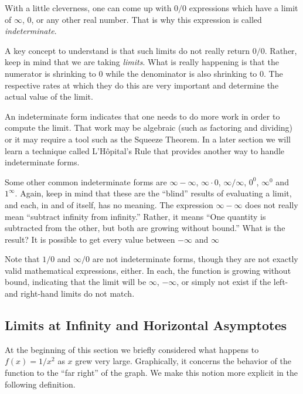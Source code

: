 With a little cleverness, one can come up with $0/0$ expressions which have a limit of $\infty$, 0, or any other real number.  That is why this expression is called \emph{indeterminate}.

A key concept to understand is that such limits do not really return $0/0$. Rather, keep in mind that we are taking \textit{limits}. What is really happening is that the numerator is shrinking to 0 while the denominator is also shrinking to 0. The respective rates at which they do this are very important and determine the actual value of the limit.

An indeterminate form indicates that one needs to do more work in order to compute the limit. That work may be algebraic (such as factoring and dividing) or it may require a tool such as the Squeeze Theorem. %
 In a later section we will learn a technique called L'H\^opital's Rule that provides another way to handle indeterminate forms.  
 
Some other common indeterminate forms are $\infty-\infty$, $\infty\cdot 0$, $\infty/\infty$, $0^0$, $\infty^0$ and $1^{\infty}$. Again, keep in mind that these are the ``blind'' results of evaluating a limit, and each, in and of itself, has no meaning. The expression $\infty-\infty$ does not really mean ``subtract infinity from infinity.'' Rather, it means ``One quantity is subtracted from the other, but both are growing without bound.'' What is the result? It is possible to get every value between $-\infty$ and $\infty$

Note that $1/0$ and $\infty/0$ are not indeterminate forms, though they are not exactly valid mathematical expressions, either.  In each, the function is growing without bound, indicating that the limit will be $\infty$, $-\infty$, or simply not exist if the left- and right-hand limits do not match.


\subsection{Limits at Infinity and Horizontal Asymptotes}

At the beginning of this section we briefly considered what happens to $f(x) = 1/x^2$ as $x$ grew very large. 
Graphically, it concerns the behavior of the function to the ``far right'' of the graph. We make this notion more explicit in the following definition.

